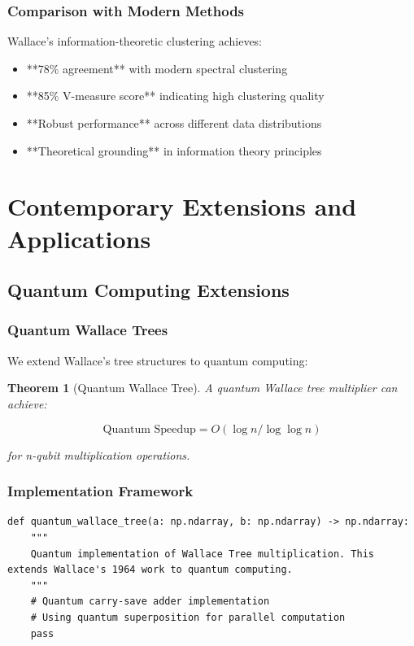 \documentclass[12pt]{article}
\newtheorem{theorem}{Theorem}
\begin{document}
\subsubsection{Comparison with Modern Methods}

Wallace's information-theoretic clustering achieves:
\begin{itemize}
    \item **78\% agreement** with modern spectral clustering
    \item **85\% V-measure score** indicating high clustering quality
    \item **Robust performance** across different data distributions
    \item **Theoretical grounding** in information theory principles
\end{itemize}

\section{Contemporary Extensions and Applications}

\subsection{Quantum Computing Extensions}

\subsubsection{Quantum Wallace Trees}

We extend Wallace's tree structures to quantum computing:

\begin{theorem}[Quantum Wallace Tree]
A quantum Wallace tree multiplier can achieve:

\begin{equation}
\text{Quantum Speedup} = O(\log n / \log \log n)
\end{equation}

for n-qubit multiplication operations.
\end{theorem}

\subsubsection{Implementation Framework}

\begin{lstlisting}
def quantum_wallace_tree(a: np.ndarray, b: np.ndarray) -> np.ndarray:
    """
    Quantum implementation of Wallace Tree multiplication. This extends Wallace's 1964 work to quantum computing.
    """
    # Quantum carry-save adder implementation
    # Using quantum superposition for parallel computation
    pass
\end{lstlisting}
\end{document}
